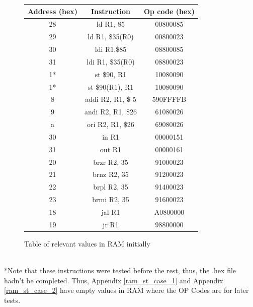 \documentclass{article}
\begin{document}
    \begin{figure}[h!] \label{relevant_ram_init}
        \begin{center}
            \begin{tabular}{|c|c|c|}
                \hline
                Address (hex) & Instruction & Op code (hex) \\
                \hline
                28 & ld R1, 85 & 00800085 \\
                \hline
                29 & ld R1, \$35(R0) & 00800023 \\
                \hline
                30 & ldi R1,\$85 & 08800085 \\
                \hline
                31 & ldi R1, \$35(R0) & 08800023 \\
                \hline
                1* & st \$90, R1 & 10080090 \\ %
                \hline
                1* & st \$90(R1), R1 & 10080090 \\ %
                \hline
                8 & addi R2, R1, \$-5 & 590FFFFB \\
                \hline
                9 & andi R2, R1, \$26 & 61080026 \\
                \hline
                a & ori R2, R1, \$26 & 69080026 \\
                \hline
                30 & in R1  & 00000151 \\
                \hline
                31 & out R1  & 00000161 \\
                \hline
                20 & brzr R2, 35 & 91000023 \\
                \hline
                21 & brnz R2, 35 & 91200023 \\
                \hline
                22 & brpl R2, 35 & 91400023 \\
                \hline
                23 & brmi R2, 35 & 91600023 \\
                \hline
                18 & jal R1 & A0800000 \\ %
                \hline
                19 & jr R1 & 98800000 \\ %
                \hline
            \end{tabular}
            \caption{Table of relevant values in RAM initially}
        \end{center}
    \end{figure}
    \\
    \small{*Note that these instructions were tested before the rest, thus, the .hex file hadn't be completed. Thus, Appendix \ref{ram_st_case_1} and Appendix \ref{ram_st_case_2} have empty values in RAM where the OP Codes are for later tests.}
\end{document}
